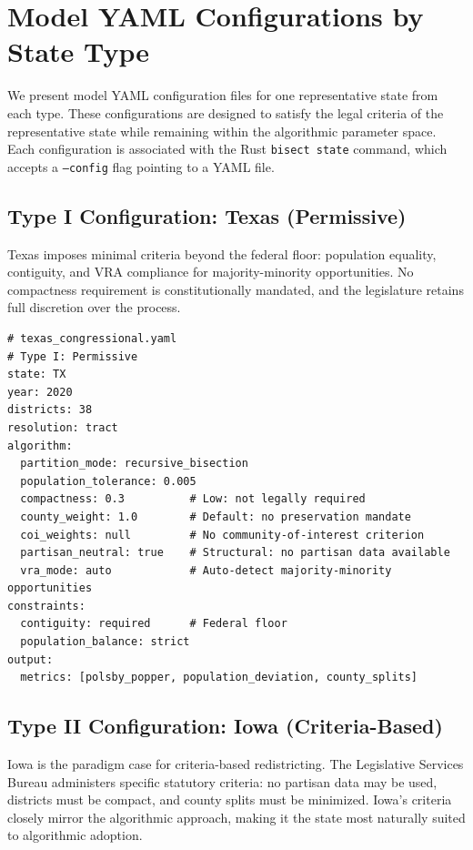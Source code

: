 \section{Model YAML Configurations by State Type}
\label{sec:configs}

We present model YAML configuration files for one representative state from each type. These configurations are designed to satisfy the legal criteria of the representative state while remaining within the algorithmic parameter space. Each configuration is associated with the Rust \texttt{bisect state} command, which accepts a \texttt{--config} flag pointing to a YAML file.

\subsection{Type I Configuration: Texas (Permissive)}

Texas imposes minimal criteria beyond the federal floor: population equality, contiguity, and VRA compliance for majority-minority opportunities. No compactness requirement is constitutionally mandated, and the legislature retains full discretion over the process.

\begin{verbatim}
# texas_congressional.yaml
# Type I: Permissive
state: TX
year: 2020
districts: 38
resolution: tract
algorithm:
  partition_mode: recursive_bisection
  population_tolerance: 0.005
  compactness: 0.3          # Low: not legally required
  county_weight: 1.0        # Default: no preservation mandate
  coi_weights: null         # No community-of-interest criterion
  partisan_neutral: true    # Structural: no partisan data available
  vra_mode: auto            # Auto-detect majority-minority opportunities
constraints:
  contiguity: required      # Federal floor
  population_balance: strict
output:
  metrics: [polsby_popper, population_deviation, county_splits]
\end{verbatim}

\subsection{Type II Configuration: Iowa (Criteria-Based)}

Iowa is the paradigm case for criteria-based redistricting. The Legislative Services Bureau administers specific statutory criteria: no partisan data may be used, districts must be compact, and county splits must be minimized. Iowa's criteria closely mirror the algorithmic approach, making it the state most naturally suited to algorithmic adoption.

